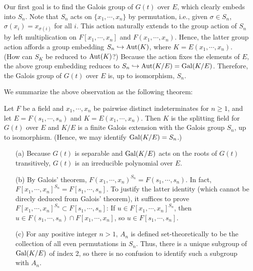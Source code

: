Our first goal is to find the Galois group of $G(t)$ over $E$, which clearly embeds into $S_n$.
Note that $S_n$ acts on $\{x_1, \cdots, x_n\}$ by permutation, i.e., given $\sigma\in S_n$, $\sigma(x_i)=x_{\sigma(i)}$ for all $i$.
This action naturally extends to the group action of $S_n$ by left multiplication on $F[x_1, \cdots, x_n]$ and $F(x_1, \cdots, x_n)$.
Hence, the latter group action affords a group embedding $S_n\hookrightarrow{\textrm{Aut}({K})}$, where $K=E(x_1, \cdots, x_n)$. \color{brown}(How can $S_K$ be reduced to ${\textrm{Aut}({K})}$?) \color{black}
Because the action fixes the elements of $E$, the above group embedding reduces to $S_n\hookrightarrow{\textrm{Aut}({K/E})}={\textrm{Gal}({K/E})}$.
Therefore, the Galois group of $G(t)$ over $E$ is, up to isomorphism, $S_n$.

We summarize the above observation as the following theorem:
\begin{thm}
    Let $F$ be a field and $x_1, \cdots, x_n$ be pairwise distinct indeterminates for $n\geq 1$, and let $E=F(s_1, \cdots, s_n)$ and $K=E(x_1, \cdots, x_n)$.
    Then $K$ is the splitting field for $G(t)$ over $E$ and $K/E$ is a finite Galois extension with the Galois group $S_n$, up to isomorphism.
    (Hence, we may identify ${\textrm{Gal}({K/E})}=S_n$.)
\end{thm}
\begin{rmk}
    \begin{enumerate}
        \item[(a)]
        {
            Because $G(t)$ is separable and ${\textrm{Gal}({K/E})}$ acts on the roots of $G(t)$ transitively, $G(t)$ is an irreducible polynomial over $E$.
        }
        \item[(b)]
        {
            By Galois' theorem, $F(x_1, \cdots, x_n)^{S_n}=F(s_1, \cdots, s_n)$.
            In fact, $F[x_1, \cdots, x_n]^{S_n}=F[s_1, \cdots, s_n]$.
            To justify the latter identity (which cannot be direcly deduced from Galois' theorem), it suffices to prove $F[x_1, \cdots, x_n]^{S_n}\subset F[s_1, \cdots, s_n]$: If $u\in F[x_1, \cdots, x_n]^{S_n}$, then $u\in F(s_1, \cdots, s_n)\cap F[x_1, \cdots, x_n]$, so $u\in F[s_1, \cdots, s_n]$.
        }
        \item[(c)]
        {
            For any positive integer $n>1$, $A_n$ is defined set-theoretically to be the collection of all even permutations in $S_n$.
            Thus, there is a unique subgroup of ${\textrm{Gal}({K/E})}$ of index 2, so there is no confusion to identify such a subgroup with $A_n$.
        }
    \end{enumerate}
\end{rmk}

